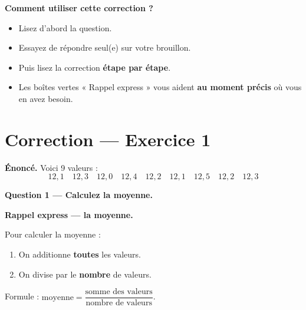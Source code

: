 \documentclass[12pt,a4paper]{article}
\begin{document}
\vspace{0.3cm}

\begin{correctionbox}
\textbf{Comment utiliser cette correction ?}

\vspace{0.2cm}
\begin{itemize}[leftmargin=*]
  \item Lisez d'abord la question.
  \item Essayez de répondre seul(e) sur votre brouillon.
  \item Puis lisez la correction \textbf{étape par étape}.
  \item Les boîtes vertes « Rappel express » vous aident \textbf{au moment précis} où vous en avez besoin.
\end{itemize}
\end{correctionbox}

\vspace{0.5cm}

\section*{Correction — Exercice 1}

\textbf{Énoncé.} Voici 9 valeurs :
\[
12{,}1 \quad 12{,}3 \quad 12{,}0 \quad 12{,}4 \quad 12{,}2 \quad 12{,}1 \quad 12{,}5 \quad 12{,}2 \quad 12{,}3
\]

\vspace{0.3cm}

\begin{correctionbox}
\textbf{Question 1 — Calculez la moyenne.}
\end{correctionbox}

\begin{rappelcible}
\textbf{Rappel express — la moyenne.}

\vspace{0.2cm}
Pour calculer la moyenne :
\begin{enumerate}[leftmargin=*]
  \item On additionne \textbf{toutes} les valeurs.
  \item On divise par le \textbf{nombre} de valeurs.
\end{enumerate}

\vspace{0.2cm}
Formule : $\text{moyenne} = \dfrac{\text{somme des valeurs}}{\text{nombre de valeurs}}$.
\end{rappelcible}
\end{document}
